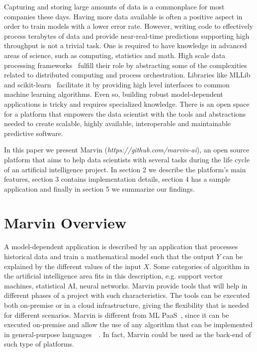 \documentclass[twoside,11pt]{article}
\begin{document}
Capturing and storing large amounts of data is a commonplace for most companies these days. Having more data available is often a positive aspect in order to train models with a lower error rate. However, writing code to effectively process terabytes of data and provide near-real-time predictions supporting high throughput is not a trivial task. One is required to have knowledge in advanced areas of science, such as computing, statistics and math. High scale data processing frameworks~\citep{zaharia2010spark} fulfill their role by abstracting some of the complexities related to distributed computing and process orchestration. Libraries like MLLib~\citep{meng2015ml} and scikit-learn~\citep{pedregosa2011scikit} facilitate it by providing high level interfaces to common machine learning algorithms. Even so, building robust model-dependent applications is tricky and requires specialized knowledge. There is an open space for a platform that empowers the data scientist with the tools and abstractions needed to create scalable, highly available, interoperable and maintainable predictive software. 

In this paper we present Marvin (\textit{https://github.com/marvin-ai}), an open source platform that aims to help data scientists with several tasks during the life cycle of an artificial intelligence project. In section 2 we describe the platform's main features, section 3 contains implementation details, section 4 has a sample application and finally in section 5 we summarize our findings.

\section{Marvin Overview}

A model-dependent application is described by an application that processes historical data and train a mathematical model such that the output $Y$ can be explained by the different values of the input $X$. Some categories of algorithm in the artificial intelligence area fits in this description, e.g. support vector machines, statistical AI, neural networks. Marvin provide tools that will help in different phases of a project with such characteristics. The tools can be executed both on-premise or in a cloud infrastructure, giving the flexibility that is needed for different scenarios. Marvin is different from ML PaaS~\citep{pmlr-v50-azureml15}, since it can be executed on-premise and allow the use of any algorithm that can be implemented in general-purpose languages~\citep{van2003python}~\citep{odersky2004scala}. In fact, Marvin could be used as the back-end of such type of platforms.
\end{document}
